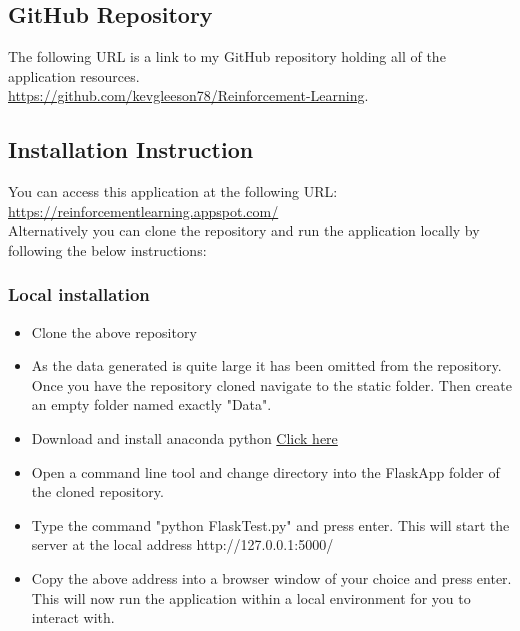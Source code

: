 \chapter{}
\section{GitHub Repository}
The following URL is a link to my GitHub repository holding all of the application resources.\\
\href{https://github.com/kevgleeson78/Reinforcement-Learning}{https://github.com/kevgleeson78/Reinforcement-Learning}.

\section{Installation Instruction}
You can access this application at the following URL:\\
\href{https://reinforcementlearning.appspot.com/}{https://reinforcementlearning.appspot.com/}\\

Alternatively you can clone the repository and run the application locally by following the below instructions:\\
\subsection{Local installation}
\begin{itemize}
	\item Clone the above repository
	\item As the data generated is quite large it has been omitted from the repository. Once you have the repository cloned navigate to the static folder.
	Then create an empty folder named exactly "Data".
	\item Download and install anaconda python \href{https://www.anaconda.com/distribution/}{Click here}
	\item Open a command line tool and change directory into the FlaskApp folder of the cloned repository.
	\item Type the command "python FlaskTest.py" and press enter. This will start the server at the local address http://127.0.0.1:5000/
	\item Copy the above address into a browser window of your choice and press enter. This will now run the application within a local environment for you to interact with.
\end{itemize} 